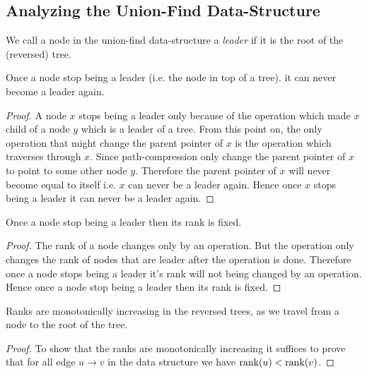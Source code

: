 \subsection{Analyzing the Union-Find Data-Structure}
We call a node in the union-find data-structure a \textit{leader} if it is the root of the (reversed) tree.
\begin{lemma}{}{}
	Once a node stop being a {leader} (i.e. the node in top of a tree). it can never become a leader again.
\end{lemma}
\begin{proof}
	A node $x$ stops being a {leader} only because of the  operation which made $x$ child of a node $y$ which is a {leader} of a tree. From this point on, the only operation that might change the parent pointer of $x$ is the  operation which traverses through $x$. Since path-compression only change the parent pointer of $x$ to point to some other node $y$. Therefore the parent pointer of $x$ will never become equal to itself i.e. $x$ can never be a {leader} again. Hence once $x$ stops being a {leader} it can never be a {leader} again.
\end{proof}
\begin{lemma}{}{}
	Once a node stop being a leader then its rank is fixed.
\end{lemma}
\begin{proof}
	The rank of a node changes only by an  operation. But the  operation only changes the rank of nodes that are {leader} after the operation is done. Therefore once a node stops being a {leader} it's rank will not being changed by an  operation. Hence once a node stop being a leader then its rank is fixed.
\end{proof}
\begin{lemma}{}{}
	Ranks are monotonically increasing in the reversed trees, as we travel from a node to
	the root of the tree.
\end{lemma}
\begin{proof}
	To show that the ranks are monotonically increasing  it suffices to prove that for all edge $u\to v$ in the data structure we have $\operatorname{rank}(u)<\operatorname{rank}(v)$.
\end{proof}

